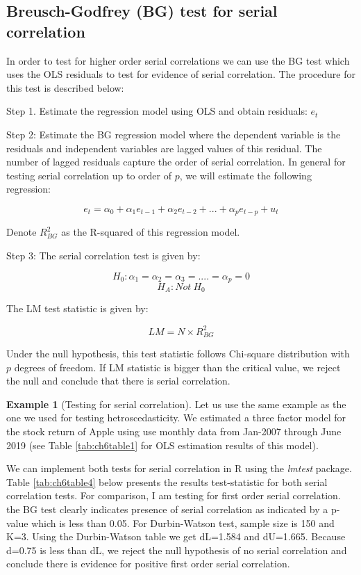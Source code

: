 \documentclass[
]{book}
\theoremstyle{definition}
\theoremstyle{definition}
\newtheorem{example}{Example}[chapter]
\theoremstyle{definition}
\theoremstyle{definition}
\theoremstyle{remark}
\begin{document}
\hypertarget{breusch-godfrey-bg-test-for-serial-correlation}{%
\subsection{Breusch-Godfrey (BG) test for serial correlation}\label{breusch-godfrey-bg-test-for-serial-correlation}}

In order to test for higher order serial correlations we can use the BG test which uses the OLS residuals to test for evidence of serial correlation. The procedure for this test is described below:

Step 1. Estimate the regression model using OLS and obtain residuals: \(e_t\)

Step 2: Estimate the BG regression model where the dependent variable is the residuals and independent variables are lagged values of this residual. The number of lagged residuals capture the order of serial correlation. In general for testing serial correlation up to order of \(p\), we will estimate the following regression:

\[e_t=\alpha_0 + \alpha_1 e_{t-1} + \alpha_2 e_{t-2} +...+ \alpha_p e_{t-p} + u_t\]

Denote \(R^2_{BG}\) as the R-squared of this regression model.

Step 3: The serial correlation test is given by:

\[H_0: \alpha_1=\alpha_2=\alpha_3=....=\alpha_p=0\]
\[H_A: Not \ H_0\]

The LM test statistic is given by:

\[LM=N\times R^2_{BG}\]

Under the null hypothesis, this test statistic follows Chi-square distribution with \(p\) degrees of freedom. If LM statistic is bigger than the critical value, we reject the null and conclude that there is serial correlation.

\begin{example}[Testing for serial correlation]
\protect\hypertarget{exm:unnamed-chunk-43}{}\label{exm:unnamed-chunk-43}Let us use the same example as the one we used for testing hetroscedasticity. We estimated a three factor model for the stock return of Apple using use monthly data from Jan-2007 through June 2019 (see Table \ref{tab:ch6table1} for OLS estimation results of this model).

We can implement both tests for serial correlation in R using the \emph{lmtest} package. Table \ref{tab:ch6table4} below presents the results test-statistic for both serial correlation tests. For comparison, I am testing for first order serial correlation. the BG test clearly indicates presence of serial correlation as indicated by a p-value which is less than 0.05. For Durbin-Watson test, sample size is 150 and K=3. Using the Durbin-Watson table we get dL=1.584 and dU=1.665. Because d=0.75 is less than dL, we reject the null hypothesis of no serial correlation and conclude there is evidence for positive first order serial correlation.
\end{example}
\end{document}
